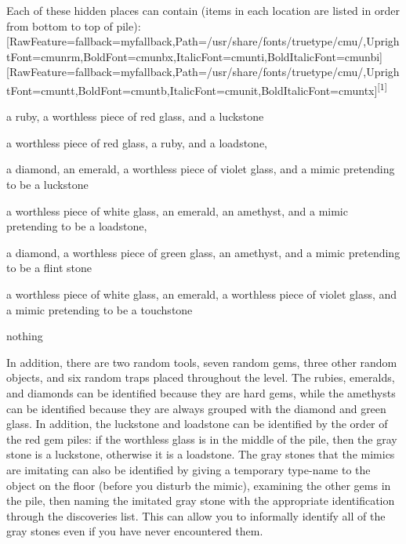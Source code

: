 Each of these hidden places can contain (items in each location are listed in order from bottom to top of pile):\allowbreak{}\setmainfont{cmunrm.ttf}[RawFeature={fallback=myfallback},Path=/usr/share/fonts/truetype/cmu/,UprightFont=cmunrm,BoldFont=cmunbx,ItalicFont=cmunti,BoldItalicFont=cmunbi]\setmonofont{cmunrm.ttf}[RawFeature={fallback=myfallback},Path=/usr/share/fonts/truetype/cmu/,UprightFont=cmuntt,BoldFont=cmuntb,ItalicFont=cmunit,BoldItalicFont=cmuntx]\textsuperscript{{$\text{[}$}1{$\text{]}$}}


\begin{myitemize}
\item{}a ruby, a worthless piece of red glass, and a luckstone
\item{}a worthless piece of red glass, a ruby, and a loadstone,
\item{}a diamond, an emerald, a worthless piece of violet glass, and a mimic pretending to be a luckstone
\item{}a worthless piece of white glass, an emerald, an amethyst, and a mimic pretending to be a loadstone,
\item{}a diamond, a worthless piece of green glass, an amethyst, and a mimic pretending to be a flint stone
\item{}a worthless piece of white glass, an emerald, a worthless piece of violet glass, and a mimic pretending to be a touchstone
\item{}nothing
\end{myitemize}

In addition, there are two random tools, seven random gems, three other random objects, and six random traps placed throughout the level. The rubies, emeralds, and diamonds can be identified because they are hard gems, while the amethysts can be identified because they are always grouped with the diamond and green glass.  In addition, the luckstone and loadstone can be identified by the order of the red gem piles: if the worthless glass is in the middle of the pile, then the gray stone is a luckstone, otherwise it is a loadstone.  The gray stones that the mimics are imitating can also be identified by giving a temporary type-{}name\footnotemark[48] to the object on the floor (before you disturb the mimic), examining the other gems in the pile, then naming the imitated gray stone with the appropriate identification through the discoveries list.  This can allow you to informally identify all of the gray stones even if you have never encountered them.

